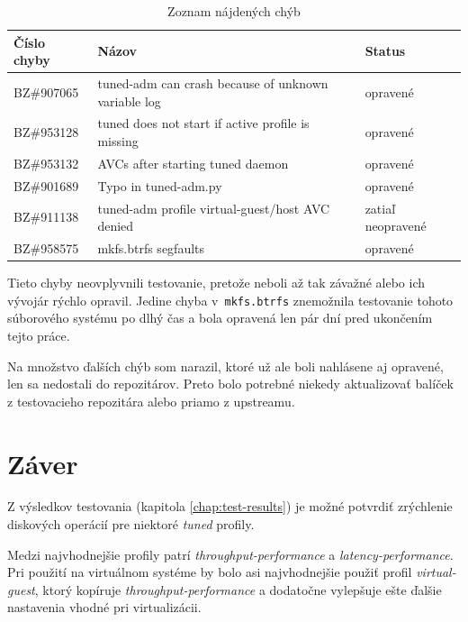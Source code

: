 \begin{table}[H]
\begin{center}
\begin{tabular}{|l|l|l|}
    \hline
    \textbf{Číslo chyby} & \textbf{Názov} & \textbf{Status} \\
    \hline
    BZ\#907065 & tuned-adm can crash because of unknown variable log & opravené \\
    BZ\#953128 & tuned does not start if active profile is missing & opravené \\
    BZ\#953132 & AVCs after starting tuned daemon & opravené \\
    BZ\#901689 & Typo in tuned-adm.py & opravené \\
    BZ\#911138 & tuned-adm profile virtual-guest/host AVC denied & zatiaľ neopravené \\
    BZ\#958575 & mkfs.btrfs segfaults & opravené \\
    \hline
\end{tabular}
\caption{Zoznam nájdených chýb}
\label{tab:bugs}
\end{center}
\end{table}

Tieto chyby neovplyvnili testovanie, pretože neboli až tak závažné alebo ich
vývojár rýchlo opravil. Jedine chyba v~\texttt{mkfs.btrfs} znemožnila
testovanie tohoto súborového systému po dlhý čas a bola opravená len pár dní
pred ukončením tejto práce.

Na množstvo ďalších chýb som narazil, ktoré už ale boli nahlásene aj opravené,
len sa nedostali do repozitárov. Preto bolo potrebné niekedy aktualizovať
balíček z testovacieho repozitára alebo priamo z upstreamu.


%
%

\chapter{Záver}

Z výsledkov testovania (kapitola \ref{chap:test-results}) je možné potvrdiť
zrýchlenie diskových operácií pre niektoré \emph{tuned} profily. 

Medzi najvhodnejšie profily patrí \emph{throughput-performance} a
\emph{latency-performance}. Pri použití na virtuálnom systéme by bolo asi
najvhodnejšie použiť profil \emph{virtual-guest},  ktorý kopíruje
\emph{throughput-performance} a dodatočne vylepšuje ešte ďalšie nastavenia
vhodné pri virtualizácii.

%
%

